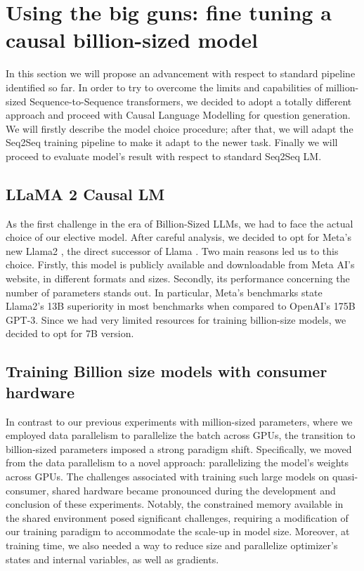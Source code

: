 \documentclass{article}
\begin{document}
\section{Using the big guns: fine tuning a causal billion-sized model}
In this section we will propose an advancement with respect to standard pipeline identified so far. In order to try to overcome the limits and capabilities of million-sized Sequence-to-Sequence transformers, we decided to adopt a totally different approach and proceed with Causal Language Modelling for question generation. We will firstly describe the model choice procedure; after that, we will adapt the Seq2Seq training pipeline to make it adapt to the newer task. Finally we will proceed to evaluate model's result with respect to standard Seq2Seq LM.

\subsection{LLaMA 2 Causal LM}
As the first challenge in the era of Billion-Sized LLMs, we had to face the actual choice of our elective model. After careful analysis, we decided to opt for Meta's new Llama2 \cite{touvron2023llama2}, the direct successor of Llama \cite{touvron2023llama}. Two main reasons led us to this choice. Firstly, this model is publicly available and downloadable from Meta AI's website, in different formats and sizes. Secondly, its performance concerning the number of parameters stands out. In particular, Meta's benchmarks state Llama2's 13B superiority in most benchmarks when compared to OpenAI's 175B GPT-3. Since we had very limited resources for training billion-size models, we decided to opt for 7B version.  

\subsection{Training Billion size models with consumer hardware}
In contrast to our previous experiments with million-sized parameters, where we employed data parallelism to parallelize the batch across GPUs, the transition to billion-sized parameters imposed a strong paradigm shift. Specifically, we moved from the data parallelism to a novel approach: parallelizing the model's weights across GPUs. The challenges associated with training such large models on quasi-consumer, shared hardware became pronounced during the development and conclusion of these experiments. Notably, the constrained memory available in the shared environment posed significant challenges, requiring a modification of our training paradigm to accommodate the scale-up in model size. Moreover, at training time, we also needed a way to reduce size and parallelize optimizer's states and internal variables, as well as gradients. 
\end{document}
